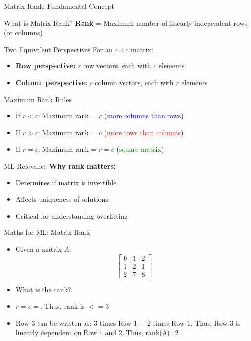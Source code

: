 \documentclass{beamer}
\begin{document}
\begin{frame}{Matrix Rank: Fundamental Concept}
\begin{definitionbox}{What is Matrix Rank?}
\textbf{Rank} = Maximum number of linearly independent rows (or columns)
\end{definitionbox}

\begin{keypointsbox}{Two Equivalent Perspectives}
For an $r \times c$ matrix:
\begin{itemize}
\item \textbf{Row perspective:} $r$ row vectors, each with $c$ elements
\item \textbf{Column perspective:} $c$ column vectors, each with $r$ elements
\end{itemize}
\end{keypointsbox}

\begin{examplebox}{Maximum Rank Rules}
\begin{itemize}
\item If $r < c$: Maximum rank = $r$ (\textcolor{blue}{more columns than rows})
\item If $r > c$: Maximum rank = $c$ (\textcolor{red}{more rows than columns})
\item If $r = c$: Maximum rank = $r = c$ (\textcolor{green}{square matrix})
\end{itemize}
\end{examplebox}

\begin{alertbox}{ML Relevance}
\textbf{Why rank matters:}
\begin{itemize}
\item Determines if matrix is invertible
\item Affects uniqueness of solutions
\item Critical for understanding overfitting
\end{itemize}
\end{alertbox}
\end{frame}

\begin{frame}{Maths for ML: Matrix Rank}
\begin{itemize}[<+-> ] 
\item Given a matrix $A$:$$
\left[\begin{array}{lll}
	{0} & {1} & {2} \\
	{1} & {2} & {1} \\
	{2} & {7} & {8}
\end{array}\right]
$$
\item What is the rank?
\item $r=c=$. Thus, rank is $<=3$
\item Row 3 can be written as: 3 times Row 1 + 2 times Row 1. Thus, Row 3 is linearly dependent on Row 1 and 2. Thus, rank(A)=2
\end{itemize}
\end{frame}
\end{document}
